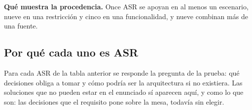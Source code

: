 \textbf{Qué muestra la procedencia.} Once ASR se apoyan en al menos un escenario, nueve en una restricción y cinco en una funcionalidad, y nueve combinan más de una fuente.

\subsection{Por qué cada uno es ASR}\label{sec:asr:porque}

Para cada ASR de la tabla anterior se responde la pregunta de la prueba: qué decisiones obliga a tomar y cómo podría ser la arquitectura si no existiera. Las soluciones que no pueden estar en el enunciado sí aparecen aquí, y como lo que son: las decisiones que el requisito pone sobre la mesa, todavía sin elegir.

